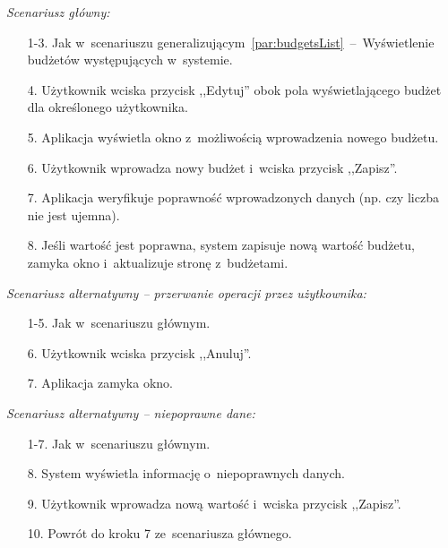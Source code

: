 \noindent \textit{Scenariusz główny:}
\begin{enumerate}
  \item[1-3.] Jak w~scenariuszu generalizującym~\ref{par:budgetsList}~--~Wyświetlenie budżetów występujących w~systemie.
  \item[4.] Użytkownik wciska przycisk ,,Edytuj'' obok pola wyświetlającego budżet dla określonego użytkownika.
  \item[5.] Aplikacja wyświetla okno z~możliwością wprowadzenia nowego budżetu.
  \item[6.] Użytkownik wprowadza nowy budżet i~wciska przycisk ,,Zapisz''.
  \item[7.] Aplikacja weryfikuje poprawność wprowadzonych danych (np. czy liczba nie jest ujemna).
  \item[8.] Jeśli wartość jest poprawna, system zapisuje nową wartość budżetu, zamyka okno i~aktualizuje stronę z~budżetami.
\end{enumerate}

\noindent \textit{Scenariusz alternatywny -- przerwanie operacji przez użytkownika:}
\begin{enumerate}
  \item[1-5.] Jak w~scenariuszu głównym.
  \item[6.] Użytkownik wciska przycisk ,,Anuluj''.
  \item[7.] Aplikacja zamyka okno.
\end{enumerate}

\noindent \textit{Scenariusz alternatywny -- niepoprawne dane:}
\begin{enumerate}
  \item[1-7.] Jak w~scenariuszu głównym.
  \item[8.] System wyświetla informację o~niepoprawnych danych.
  \item[9.] Użytkownik wprowadza nową wartość i~wciska przycisk ,,Zapisz''.
  \item[10.] Powrót do kroku 7 ze~scenariusza głównego.
\end{enumerate}

